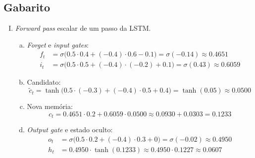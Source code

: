 \documentclass{dlproblemset}
\begin{document}
\subsection*{Gabarito}
\color{blue}
\begin{enumerate}[I)]

\item \textit{Forward pass} escalar de um passo da LSTM.
\begin{enumerate}[(a)]
    \item \textit{Forget} e \textit{input gates}:
    \begin{align*}
        f_t &= \sigma\bigl(0.5 \cdot 0.4 + (-0.4) \cdot 0.6 - 0.1\bigr)
            = \sigma(-0.14) \approx 0.4651 \\
        i_t &= \sigma\bigl(0.5 \cdot 0.5 + (-0.4) \cdot (-0.2) + 0.1\bigr)
            = \sigma(0.43) \approx 0.6059
    \end{align*}
    \item Candidato:
    \[
        \tilde{c}_t = \tanh\bigl(0.5 \cdot (-0.3) + (-0.4) \cdot 0.5 + 0.4\bigr)
            = \tanh(0.05) \approx 0.0500
    \]
    \item Nova memória:
    \[
        c_t = 0.4651 \cdot 0.2 + 0.6059 \cdot 0.0500
            \approx 0.0930 + 0.0303 = 0.1233
    \]
    \item \textit{Output gate} e estado oculto:
    \begin{align*}
        o_t &= \sigma\bigl(0.5 \cdot 0.2 + (-0.4) \cdot 0.3 + 0\bigr)
            = \sigma(-0.02) \approx 0.4950 \\
        h_t &= 0.4950 \cdot \tanh(0.1233) \approx 0.4950 \cdot 0.1227 \approx 0.0607
    \end{align*}
\end{enumerate}


\end{enumerate}
\end{document}
